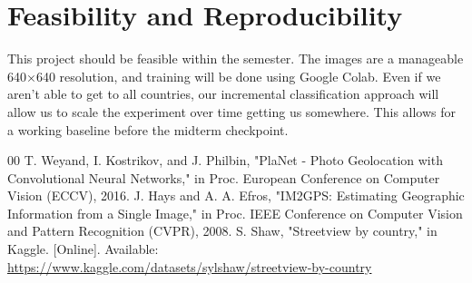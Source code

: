 \documentclass[conference]{IEEEtran}
\begin{document}
\section{Feasibility and Reproducibility}

This project should be feasible within the semester.
The images are a manageable 640×640 resolution, and training will be done using Google Colab. Even if we aren't able to get to all countries, our incremental classification approach will allow us to scale the experiment over time getting us somewhere.
This allows for a working baseline before the midterm checkpoint.


\begin{thebibliography}{00}
 T. Weyand, I. Kostrikov, and J. Philbin, "PlaNet - Photo Geolocation with Convolutional Neural Networks," in Proc. European Conference on Computer Vision (ECCV), 2016.
 J. Hays and A. A. Efros, "IM2GPS: Estimating Geographic Information from a Single Image," in Proc. IEEE Conference on Computer Vision and Pattern Recognition (CVPR), 2008.
 S. Shaw, "Streetview by country," in Kaggle. [Online]. Available: \url{https://www.kaggle.com/datasets/sylshaw/streetview-by-country}

\end{thebibliography}
\vspace{12pt}
\end{document}
